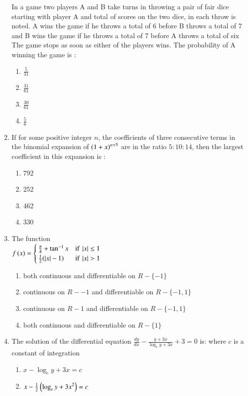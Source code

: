 \documentclass[journal]{IEEEtran}
\begin{document}
\begin{enumerate}
	In a game two players A and B take turns in throwing a pair of fair dice starting with player A and total of scores on the two dice, in each throw is noted. A wins the game if he throws a total of 6 before B throws a total of 7 and B wins the game if he throws a total of 7 before A throws a total of six The game stops as soon as either of the players wins. The probability of A winning the game is :
		\begin{enumerate}
			\item $\frac{5}{31}$
			\item $\frac{31}{61}$
			\item $\frac{30}{61}$
			\item $\frac{5}{6}$
		\end{enumerate}
	\item
	If for some positive integer $n$, the coefficients of three consecutive terms in the binomial expansion of $\left(1+x\right)^{n+5}$ are in the ratio $5:10:14$, then the largest coefficient in this expansion is :
		\begin{enumerate}
			\item 792
			\item 252
			\item 462
			\item 330
		\end{enumerate}
	\item
	The function \\
	$f\left(x\right) =
	\begin{cases}
    		\frac{\pi}{4} + \tan^{-1}{x} & \text{if } \left\vert x\right\vert \leq 1 \\
    		\frac{1}{2}(\left\vert x\right\vert-1) & \text{if } \left\vert x\right\vert > 1
	\end{cases}
	$
		\begin{enumerate}
			\item  both continuous and differentiable on $R-\{-1\}$
			\item continuous on $R-{-1}$ and differentiable on $R-\{-1,1\}$
			\item continuous on $R-{1}$ and differentiable on $R-\{-1,1\}$
			\item both continuous and differentiable on $R-\{1\}$
		\end{enumerate}
	\item 
	The solution of the differential equation $\frac{dy}{dx}-\frac{y+3x}{\log_e{y+3x}} + 3 = 0$ is: where $c$ is a constant of integration
		\begin{enumerate}
			\item $x - \log_{e}{y+3x} = c$
			\item $x - \frac{1}{2}\left({\log_{e}{y+3x}}^2\right) = c$

\end{enumerate}
\end{enumerate}
\end{document}
